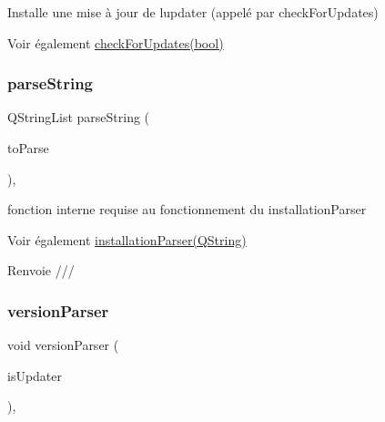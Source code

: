 Installe une mise à jour de l\textquotesingle{}updater (appelé par check\+For\+Updates) 

\begin{DoxySeeAlso}{Voir également}
\hyperlink{classmainWindow_a52d5ce0b17a87a34ac1038508e3a5c45}{check\+For\+Updates(bool)} 
\end{DoxySeeAlso}
\mbox{\label{classmainWindow_a5eed4f5e05f3553c3318d8ce8a3dd94d}} 
\subsubsection{\texorpdfstring{parse\+String}{parseString}}
{\footnotesize\ttfamily Q\+String\+List parse\+String (\begin{DoxyParamCaption}\item[{Q\+String}]{to\+Parse }\end{DoxyParamCaption})\hspace{0.3cm}{\ttfamily [private]}, {\ttfamily [slot]}}



fonction interne requise au fonctionnement du installation\+Parser 

\begin{DoxySeeAlso}{Voir également}
\hyperlink{classmainWindow_abb015d99703b6a2624fc2d543a10552d}{installation\+Parser(\+Q\+String)} 
\end{DoxySeeAlso}
\begin{DoxyReturn}{Renvoie}
/// 
\end{DoxyReturn}
\mbox{\label{classmainWindow_a47f43ddb89ca56a42446630e9b7e1153}} 
\subsubsection{\texorpdfstring{version\+Parser}{versionParser}}
{\footnotesize\ttfamily void version\+Parser (\begin{DoxyParamCaption}\item[{bool}]{is\+Updater }\end{DoxyParamCaption})\hspace{0.3cm}{\ttfamily [private]}, {\ttfamily [slot]}}




